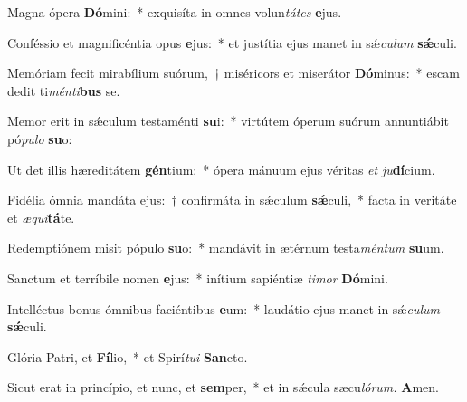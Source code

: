 \item Magna ópera \textbf{Dó}mini:~* exquisíta in omnes volun\tinyhspace\textit{tátes} \textbf{e}jus.
\item Conféssio et magnificéntia opus \textbf{e}jus:~* et justítia ejus manet in sǽ\tinyhspace\textit{culum} \textbf{sǽ}culi.
\item Memóriam fecit mirabílium suórum,~† miséricors et miserátor \textbf{Dó}minus:~* escam dedit ti\textit{ménti}\textbf{bus} se.
\item Memor erit in sǽculum testaménti \textbf{su}i:~* virtútem óperum suórum annuntiábit pó\textit{pulo} \textbf{su}o:
\item Ut det illis hæreditátem \textbf{gén}tium:~* ópera mánuum ejus véritas \textit{et} \textit{ju}\textbf{dí}cium.
\item Fidélia ómnia mandáta ejus:~† confirmáta in sǽculum \textbf{sǽ}culi,~* facta in veritáte et \textit{æqui}\textbf{tá}te.
\item Redemptiónem misit pópulo \textbf{su}o:~* mandávit in ætérnum testa\tinyhspace\textit{méntum} \textbf{su}um.
\item Sanctum et terríbile nomen \textbf{e}jus:~* inítium sapiéntiæ \textit{timor} \textbf{Dó}mini.
\item Intelléctus bonus ómnibus faciéntibus \textbf{e}um:~* laudátio ejus manet in sǽ\tinyhspace\textit{culum} \textbf{sǽ}culi.
\item Glória Patri, et \textbf{Fí}lio,~* et Spirí\tinyhspace\textit{tui} \textbf{San}cto.
\item Sicut erat in princípio, et nunc, et \textbf{sem}per,~* et in sǽcula sæcu\tinyhspace\textit{lórum.} \textbf{A}men.